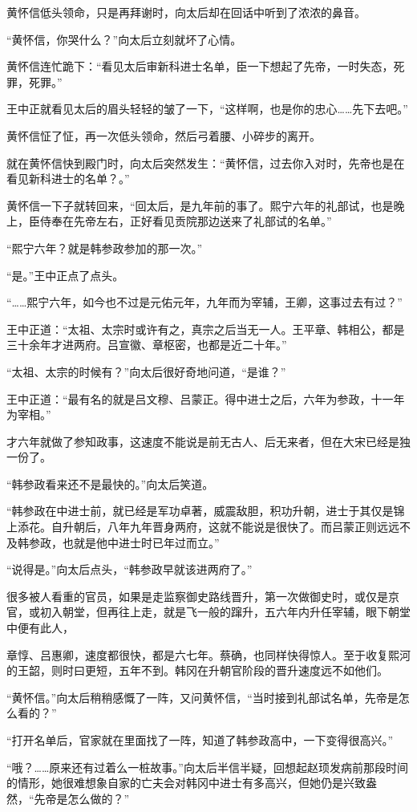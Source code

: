 黄怀信低头领命，只是再拜谢时，向太后却在回话中听到了浓浓的鼻音。

“黄怀信，你哭什么？”向太后立刻就坏了心情。

黄怀信连忙跪下：“看见太后审新科进士名单，臣一下想起了先帝，一时失态，死罪，死罪。”

王中正就看见太后的眉头轻轻的皱了一下，“这样啊，也是你的忠心……先下去吧。”

黄怀信怔了怔，再一次低头领命，然后弓着腰、小碎步的离开。

就在黄怀信快到殿门时，向太后突然发生：“黄怀信，过去你入对时，先帝也是在看见新科进士的名单？。”

黄怀信一下子就转回来，“回太后，是九年前的事了。熙宁六年的礼部试，也是晚上，臣侍奉在先帝左右，正好看见贡院那边送来了礼部试的名单。”

“熙宁六年？就是韩参政参加的那一次。”

“是。”王中正点了点头。

“……熙宁六年，如今也不过是元佑元年，九年而为宰辅，王卿，这事过去有过？”

王中正道：“太祖、太宗时或许有之，真宗之后当无一人。王平章、韩相公，都是三十余年才进两府。吕宣徽、章枢密，也都是近二十年。”

“太祖、太宗的时候有？”向太后很好奇地问道，“是谁？”

王中正道：“最有名的就是吕文穆、吕蒙正。得中进士之后，六年为参政，十一年为宰相。”

才六年就做了参知政事，这速度不能说是前无古人、后无来者，但在大宋已经是独一份了。

“韩参政看来还不是最快的。”向太后笑道。

“韩参政在中进士前，就已经是军功卓著，威震敌胆，积功升朝，进士于其仅是锦上添花。自升朝后，八年九年晋身两府，这就不能说是很快了。而吕蒙正则远远不及韩参政，也就是他中进士时已年过而立。”

“说得是。”向太后点头，“韩参政早就该进两府了。”

很多被人看重的官员，如果是走监察御史路线晋升，第一次做御史时，或仅是京官，或初入朝堂，但再往上走，就是飞一般的蹿升，五六年内升任宰辅，眼下朝堂中便有此人，

章惇、吕惠卿，速度都很快，都是六七年。蔡确，也同样快得惊人。至于收复熙河的王韶，则时曰更短，五年不到。韩冈在升朝官阶段的晋升速度远不如他们。

“黄怀信。”向太后稍稍感慨了一阵，又问黄怀信，“当时接到礼部试名单，先帝是怎么看的？”

“打开名单后，官家就在里面找了一阵，知道了韩参政高中，一下变得很高兴。”

“哦？……原来还有过着么一桩故事。”向太后半信半疑，回想起赵顼发病前那段时间的情形，她很难想象自家的亡夫会对韩冈中进士有多高兴，但她仍是兴致盎然，“先帝是怎么做的？”

